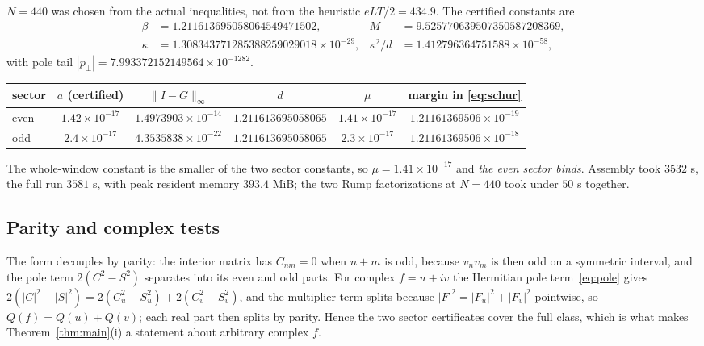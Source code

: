 \documentclass[11pt,a4paper]{article}
\theoremstyle{definition}
\theoremstyle{remark}
\begin{document}
$N = 440$ was chosen from the actual inequalities, not from the heuristic
$eLT/2 = 434.9$. The certified constants are
\begin{align*}
  \beta &= 1.211613695058064549471502, &
  M &= 9.525770639507350587208369, \\
  \kappa &= 1.308343771285388259029018\times10^{-29}, &
  \kappa^2/d &= 1.412796364751588\times10^{-58},
\end{align*}
with pole tail $|p_{\perp}| = 7.993372152149564\times10^{-1282}$.

\begin{center}
\begin{tabular}{lccccc}
\toprule
sector & $a$ (certified) & $\|I-G\|_{\infty}$ & $d$ & $\mu$ & margin in \eqref{eq:schur} \\
\midrule
even & $1.42\times10^{-17}$ & $1.4973903\times10^{-14}$ & $1.211613695058065$ & $1.41\times10^{-17}$ & $1.21161369506\times10^{-19}$ \\
odd  & $2.4\times10^{-17}$  & $4.3535838\times10^{-22}$ & $1.211613695058065$ & $2.3\times10^{-17}$  & $1.21161369506\times10^{-18}$ \\
\bottomrule
\end{tabular}
\end{center}

The whole-window constant is the smaller of the two sector constants, so
$\mu = 1.41\times10^{-17}$ and \emph{the even sector binds}. Assembly took
$3532$ s, the full run $3581$ s, with peak resident memory $393.4$ MiB; the two
Rump factorizations at $N = 440$ took under $50$ s together.

\subsection{Parity and complex tests}
\label{sec:parity-complex}

The form decouples by parity: the interior matrix has $C_{nm} = 0$ when $n+m$ is
odd, because $v_nv_m$ is then odd on a symmetric interval, and the pole term
$2(C^2 - S^2)$ separates into its even and odd parts. For complex $f = u + iv$
the Hermitian pole term~\eqref{eq:pole} gives
$2(|C|^2 - |S|^2) = 2(C_u^2 - S_u^2) + 2(C_v^2 - S_v^2)$, and the multiplier
term splits because $|F|^2 = |F_u|^2 + |F_v|^2$ pointwise, so
$Q(f) = Q(u) + Q(v)$; each real part then splits by parity. Hence the two sector certificates cover the full class, which is what
makes Theorem~\ref{thm:main}(i) a statement about arbitrary complex $f$.
\end{document}
